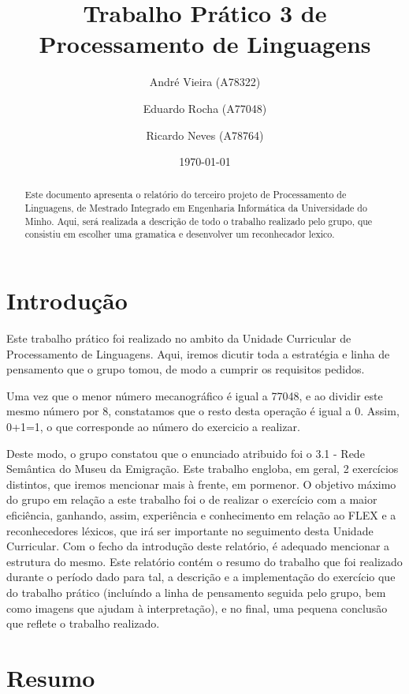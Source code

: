 \documentclass[a4paper]{article}
\title{Trabalho Prático 3 de Processamento de Linguagens}
\author{André Vieira (A78322) \and Eduardo Rocha (A77048) \and Ricardo Neves (A78764)}
\date{\today}
\begin{document}
\maketitle

\begin{abstract}
  Este documento apresenta o relatório do terceiro projeto de Processamento de Linguagens, 
  de Mestrado Integrado em Engenharia Informática da Universidade do Minho.
  Aqui, será realizada a descrição de todo o trabalho realizado pelo grupo, que
  consistiu em escolher uma gramatica e desenvolver um reconhecador lexico.

\end{abstract}

\tableofcontents

\vspace{150px}
\section{Introdução}
\label{sec:intro}

Este trabalho prático foi realizado no ambito da Unidade Curricular de Processamento de Linguagens.
Aqui, iremos dicutir toda a estratégia e linha de pensamento que o grupo tomou, de modo a cumprir os requisitos pedidos.

Uma vez que o menor número mecanográfico é igual a 77048, e ao dividir este mesmo número por 8, constatamos que o resto desta operação é igual a 0. Assim, 0+1=1, o que corresponde ao número do exercicio a realizar.

Deste modo, o grupo constatou que o enunciado atribuido foi o 3.1 - Rede Semântica do Museu da Emigração.
Este trabalho engloba, em geral, 2 exercícios distintos, que iremos mencionar mais à frente, em pormenor.
O objetivo máximo do grupo em relação a este trabalho foi o de realizar o exercício com a maior eficiência, ganhando, assim, experiência e conhecimento em relação ao FLEX e a reconhecedores léxicos, que irá ser importante no seguimento desta Unidade Curricular. 
Com o fecho da introdução deste relatório, é adequado mencionar a estrutura do mesmo. Este relatório contém o resumo do trabalho que foi realizado durante o período dado para tal, a descrição e a implementação do exercício que do trabalho prático (incluíndo a linha de pensamento seguida pelo grupo, bem como imagens que ajudam à interpretação), e no final, uma pequena conclusão que reflete o trabalho realizado.

\vspace{300px}
\section{Resumo}
\label{sec:resumo}
\end{document}
